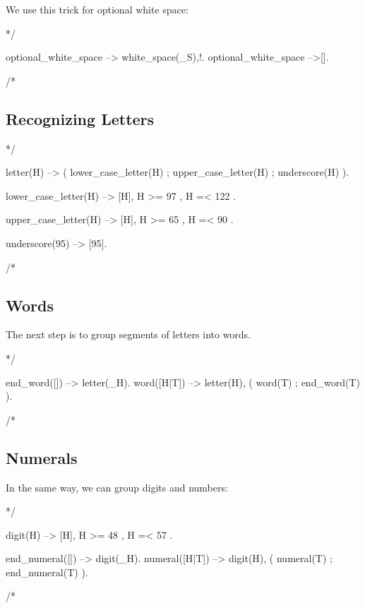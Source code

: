 \documentclass{book}[9pt]
\newenvironment{code}%
{\small \verbatim}%
{\endverbatim \large}
\begin{document}
We use this trick for optional white space:

\begin{code}
*/

optional_white_space --> white_space(_S),!.
optional_white_space -->[].

/*
\end{code}

\subsection{Recognizing Letters}

\begin{code}
*/

letter(H) -->
        (
          lower_case_letter(H)
        ;
          upper_case_letter(H)
        ;
          underscore(H)
        ).


lower_case_letter(H) -->
        [H],
        { H >= 97  },
        { H =< 122 }.

upper_case_letter(H) -->
        [H],
        { H >= 65 },
        { H =< 90 }.

underscore(95) --> [95].

/*
\end{code}

\subsection{Words}

The next step is to group segments of letters into words.

\begin{code}
*/

end_word([]) --> \+ letter(_H).
word([H|T]) -->
        letter(H),
        ( word(T)
        ; end_word(T)
        ).


/*
\end{code}

\subsection{Numerals}

In the same way, we can group digits and numbers:

\begin{code}
*/

digit(H) -->
        [H],
        { H >= 48 },
        { H =< 57 }.

end_numeral([]) --> \+ digit(_H).
numeral([H|T]) -->
        digit(H),
        (
          numeral(T)
        ;
          end_numeral(T)
        ).

/*
\end{code}
\end{document}
